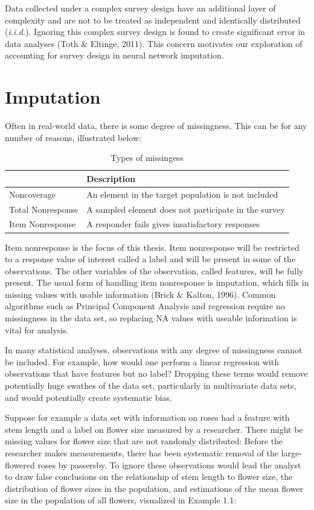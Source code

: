 \documentclass[12pt,twoside]{reedthesis}
\begin{document}
Data collected under a complex survey design have an additional layer of
complexity and are not to be treated as independent and identically
distributed (\emph{i.i.d.}). Ignoring this complex survey design is
found to create significant error in data analyses (Toth \& Eltinge,
2011). This concern motivates our exploration of accounting for survey
design in neural network imputation.

\section{Imputation}\label{imputation}

Often in real-world data, there is some degree of missingness. This can
be for any number of reasons, illustrated below:
\begin{table}[t]

\caption{\label{tab:missingness}Types of missingess}
\centering
\begin{tabular}{l|l}
\hline
  & Description\\
\hline
Noncoverage & An element in the target population is not included\\
\hline
Total Nonresponse & A sampled element does not participate in the survey\\
\hline
Item Nonresponse & A responder fails gives insatisfactory responses\\
\hline
\end{tabular}
\end{table}
Item nonresponse is the focus of this thesis. Item nonresponse will be
restricted to a response value of interest called a label and will be
present in some of the observations. The other variables of the
observation, called features, will be fully present. The usual form of
handling item nonresponse is imputation, which fills in missing values
with usable information (Brick \& Kalton, 1996). Common algorithms such
as Principal Component Analysis and regression require no missingness in
the data set, so replacing NA values with useable information is vital
for analysis.

In many statistical analyses, observations with any degree of
missingness cannot be included. For example, how would one perform a
linear regression with observations that have features but no label?
Dropping these terms would remove potentially huge swathes of the data
set, particularly in multivariate data sets, and would potentially
create systematic bias.

Suppose for example a data set with information on roses had a feature
with stem length and a label on flower size measured by a researcher.
There might be missing values for flower size that are not randomly
distributed: Before the researcher makes measurements, there has been
systematic removal of the large-flowered roses by passersby. To ignore
these observations would lead the analyst to draw false conclusions on
the relationship of stem length to flower size, the distribution of
flower sizes in the population, and estimations of the mean flower size
in the population of all flowers, visualized in Example 1.1:
\end{document}
